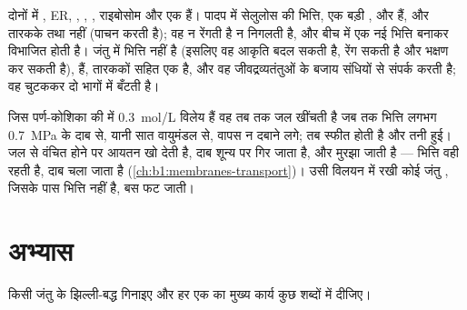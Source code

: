 \begin{proposition}[पादप और जंतु कोशिका की तुलना]\label{prop:b1:eukaryotic-cell:compare}
दोनों में , ER, , , , राइबोसोम और एक
 हैं। पादप  में सेलुलोस की भित्ति, एक बड़ी , 
और  हैं, और तारकके तथा  नहीं (पाचन  करती है);
वह न रेंगती है न निगलती है, और बीच में एक नई भित्ति बनाकर विभाजित होती
है। जंतु  में भित्ति नहीं है (इसलिए वह आकृति बदल सकती है, रेंग
सकती है और भक्षण कर सकती है),  हैं, तारककों सहित एक  है, और
वह जीवद्रव्यतंतुओं के बजाय संधियों से संपर्क करती है; वह चुटककर दो भागों
में बँटती है।
\end{proposition}

\begin{example}[स्फीति]\label{ex:b1:eukaryotic-cell:turgor}
जिस पर्ण-कोशिका की  में \qty{0.3}{mol/L} विलेय हैं वह तब तक जल
खींचती है जब तक भित्ति लगभग \qty{0.7}{MPa} के दाब से, यानी सात वायुमंडल
से, वापस न दबाने लगे; तब  स्फीत होती है और  तनी हुई। जल से
वंचित होने पर  आयतन खो देती है, दाब शून्य पर गिर जाता है, और
 मुरझा जाती है --- भित्ति वही रहती है, दाब चला जाता है
(\cref{ch:b1:membranes-transport})। उसी विलयन में रखी कोई जंतु ,
जिसके पास भित्ति नहीं है, बस फट जाती।
\end{example}

\section{अभ्यास}

\begin{exercise}[$\star$]\label{exo:b1:eukaryotic-cell:1}
किसी जंतु  के झिल्ली-बद्ध  गिनाइए और हर एक का मुख्य कार्य
कुछ शब्दों में दीजिए।
\end{exercise}

